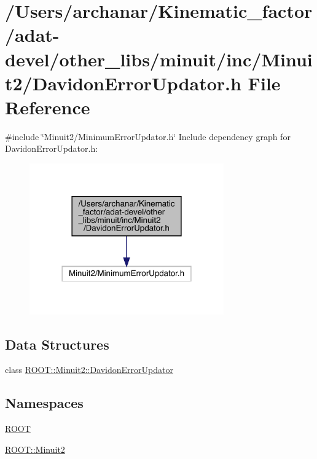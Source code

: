\hypertarget{adat-devel_2other__libs_2minuit_2inc_2Minuit2_2DavidonErrorUpdator_8h}{}\section{/\+Users/archanar/\+Kinematic\+\_\+factor/adat-\/devel/other\+\_\+libs/minuit/inc/\+Minuit2/\+Davidon\+Error\+Updator.h File Reference}
\label{adat-devel_2other__libs_2minuit_2inc_2Minuit2_2DavidonErrorUpdator_8h}
{\ttfamily \#include \char`\"{}Minuit2/\+Minimum\+Error\+Updator.\+h\char`\"{}}\newline
Include dependency graph for Davidon\+Error\+Updator.\+h\+:
\nopagebreak
\begin{figure}[H]
\begin{center}
\leavevmode
\includegraphics[width=237pt]{db/d8d/adat-devel_2other__libs_2minuit_2inc_2Minuit2_2DavidonErrorUpdator_8h__incl}
\end{center}
\end{figure}
\subsection*{Data Structures}
\begin{DoxyCompactItemize}
\item 
class \mbox{\hyperlink{classROOT_1_1Minuit2_1_1DavidonErrorUpdator}{R\+O\+O\+T\+::\+Minuit2\+::\+Davidon\+Error\+Updator}}
\end{DoxyCompactItemize}
\subsection*{Namespaces}
\begin{DoxyCompactItemize}
\item 
 \mbox{\hyperlink{namespaceROOT}{R\+O\+OT}}
\item 
 \mbox{\hyperlink{namespaceROOT_1_1Minuit2}{R\+O\+O\+T\+::\+Minuit2}}
\end{DoxyCompactItemize}
